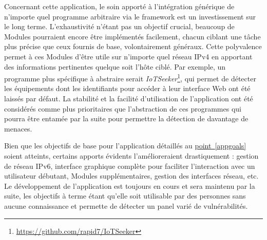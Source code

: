 \documentclass[]{article}
\newcommand{\wordlink}[2]{\hyperref[#1]{#2~\ref{#1}}}
\begin{document}
\par Concernant cette application, le soin apporté à l'intégration générique de n'importe quel programme arbitraire via le framework est un investissement sur le long terme. L'exhaustivité n'étant pas un objectif crucial, beaucoup de Modules pourraient encore être implémentés facilement, chacun ciblant une tâche plus précise que ceux fournis de base, volontairement généraux. Cette polyvalence permet à ces Modules d'être utile sur n'importe quel réseau IPv4 en apportant des informations pertinentes quelque soit l'hôte ciblé. Par exemple, un programme plus spécifique à abstraire serait \textit{IoTSeeker}\footnote{\url{https://github.com/rapid7/IoTSeeker}}, qui permet de détecter les équipements dont les identifiants pour accéder à leur interface Web ont été laissés par défaut. La stabilité et la facilité d'utilisation de l'application ont été considérés comme plus prioritaires que l'abstraction de ces programmes qui pourra être entamée par la suite pour permettre la détection de davantage de menaces.\\

\par Bien que les objectifs de base pour l'application détaillés au \wordlink{appgoals}{point} soient atteints, certains apports évidents l'amélioreraient drastiquement : gestion de réseau IPv6, interface graphique complète pour faciliter l'interaction avec un utilisateur débutant, Modules supplémentaires, gestion des interfaces réseau, etc. Le développement de l'application est toujours en cours et sera maintenu par la suite, les objectifs à terme étant qu'elle soit utilisable par des personnes sans aucune connaissance et permette de détecter un panel varié de vulnérabilités.

\newpage



\end{document}
